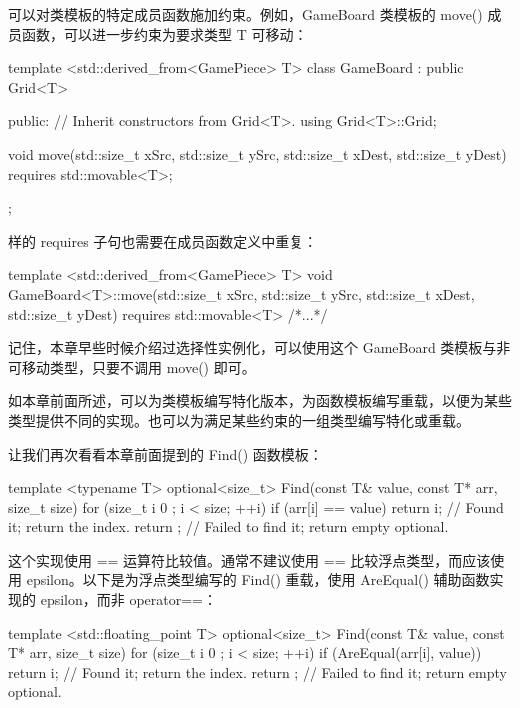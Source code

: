 
可以对类模板的特定成员函数施加约束。例如，GameBoard 类模板的 move() 成员函数，可以进一步约束为要求类型 T 可移动：

\begin{cpp}
template <std::derived_from<GamePiece> T>
class GameBoard : public Grid<T>
{
    public:
        // Inherit constructors from Grid<T>.
        using Grid<T>::Grid;

        void move(std::size_t xSrc, std::size_t ySrc,
            std::size_t xDest, std::size_t yDest) requires std::movable<T>;
};
\end{cpp}

样的 requires 子句也需要在成员函数定义中重复：

\begin{cpp}
template <std::derived_from<GamePiece> T>
void GameBoard<T>::move(std::size_t xSrc, std::size_t ySrc,
    std::size_t xDest, std::size_t yDest) requires std::movable<T>
{ /*...*/ }
\end{cpp}

记住，本章早些时候介绍过选择性实例化，可以使用这个 GameBoard 类模板与非可移动类型，只要不调用 move() 即可。


如本章前面所述，可以为类模板编写特化版本，为函数模板编写重载，以便为某些类型提供不同的实现。也可以为满足某些约束的一组类型编写特化或重载。

让我们再次看看本章前面提到的 Find() 函数模板：

\begin{cpp}
template <typename T>
optional<size_t> Find(const T& value, const T* arr, size_t size)
{
    for (size_t i { 0 }; i < size; ++i) {
        if (arr[i] == value) {
            return i; // Found it; return the index.
            }
        }
    return {}; // Failed to find it; return empty optional.
}
\end{cpp}

这个实现使用 == 运算符比较值。通常不建议使用 == 比较浮点类型，而应该使用 epsilon。以下是为浮点类型编写的 Find() 重载，使用 AreEqual() 辅助函数实现的 epsilon，而非 operator==：

\begin{cpp}
template <std::floating_point T>
optional<size_t> Find(const T& value, const T* arr, size_t size)
{
    for (size_t i { 0 }; i < size; ++i) {
        if (AreEqual(arr[i], value)) {
            return i; // Found it; return the index.
        }
    }
    return {}; // Failed to find it; return empty optional.
}
\end{cpp}

